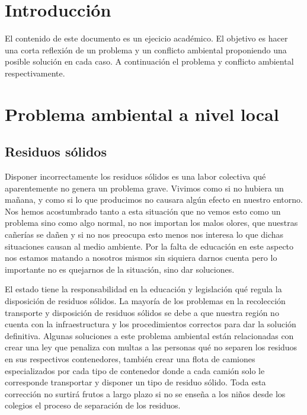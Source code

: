 \documentclass[a4paper,man,natbib]{apa6}
\begin{document}


\section{Introducción}
El contenido de este documento es un ejecicio académico. El objetivo es hacer una corta reflexión de un problema y un conflicto ambiental proponiendo una posible solución en cada caso. A continuación el problema y conflicto ambiental respectivamente.

\section{Problema ambiental a nivel local}
\subsection{Residuos sólidos}
Disponer incorrectamente los residuos sólidos es una labor colectiva qué aparentemente no genera un problema grave. Vivimos como si no hubiera un mañana, y como si lo que producimos no causara algún efecto en nuestro entorno. Nos hemos acostumbrado tanto a esta situación que no vemos esto como un problema sino como algo normal, no nos importan los malos olores, que nuestras cañerías se dañen y si no nos preocupa esto menos nos interesa lo que dichas situaciones causan al medio ambiente. Por la falta de educación en este aspecto nos estamos matando a nosotros mismos sin siquiera darnos cuenta pero lo importante no es quejarnos de la situación, sino dar soluciones.\newline

El estado tiene la responsabilidad en la educación y legislación qué regula la disposición de residuos sólidos. La mayoría de los problemas en la recolección transporte y disposición de residuos sólidos se debe a que nuestra región no cuenta con la infraestructura y los procedimientos correctos para dar la solución definitiva. Algunas soluciones a este problema ambiental están relacionadas con crear una ley que penaliza con multas a las personas qué no separen los residuos en sus respectivos contenedores, también crear una flota de camiones especializados por cada tipo de contenedor donde a cada camión solo le corresponde transportar y disponer un tipo de residuo sólido. Toda esta corrección no surtirá frutos a largo plazo si no se enseña a los niños desde los colegios el proceso de separación de los residuos.\newline
\end{document}
